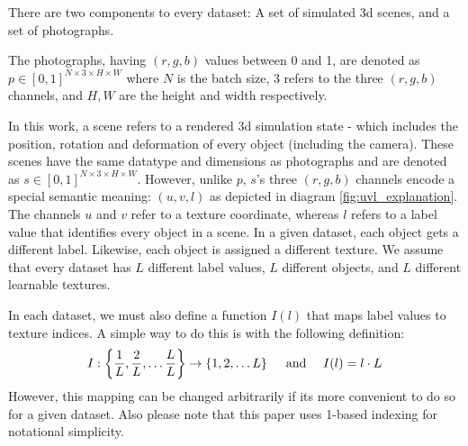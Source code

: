 \documentclass{article}
\begin{document}
	There are two components to every dataset: A set of simulated 3d scenes, and a set of photographs.

	The photographs, having $(r,g,b)$ values between 0 and 1,
		are denoted as $p \in [0,1]^{N \times 3 \times H \times W}$ where $N$ is the batch size,
		3 refers to the three $(r,g,b)$ channels, 
		and $H,W$ are the height and width respectively.

	In this work, a scene refers to a rendered 3d simulation state - which includes the position, rotation and deformation of every object (including the camera).
	These scenes have the same datatype and dimensions as photographs and are denoted as $s \in [0,1]^{N \times 3 \times H \times W}$.
	However, unlike $p$, $s$'s three $(r,g,b)$ channels encode a special semantic meaning: $(u,v,l)$ as depicted in diagram \ref{fig:uvl_explanation}.
	The channels $u$ and $v$ refer to a texture coordinate, whereas $l$ refers to a label value that identifies every object in a scene.
	In a given dataset, each object gets a different label. Likewise, each object is assigned a different texture.
	We assume that every dataset has $L$ different label values, $L$ different objects, and $L$ different learnable textures. 

	In each dataset, we must also define a function $I(l)$ that maps label values to texture indices. A simple way to do this is with the following definition:
	\begin{equation}
		I: \left\{\frac{1}{L},\frac{2}{L},\dots \frac{L}{L}\right\} \rightarrow \left\{1,2,\dots L\right\}  \ \ \ \text{ and }\ \ \   I(l)=l\cdot L
	\end{equation}
	However, this mapping can be changed arbitrarily if its more convenient to do so for a given dataset.
	Also please note that this paper uses 1-based indexing for notational simplicity. 





\end{document}
